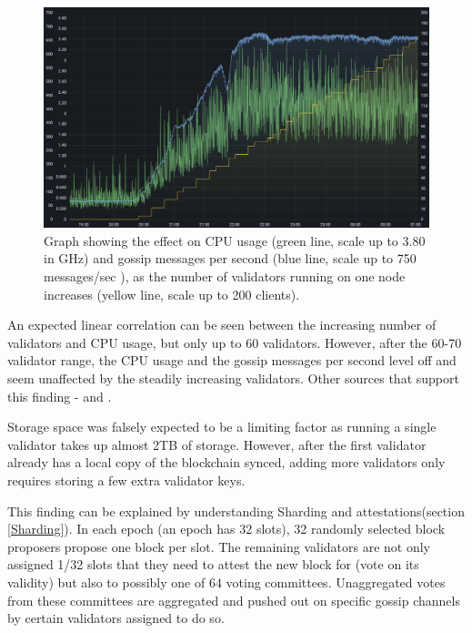 \begin{figure}[htb!]
    \centering
    \includegraphics[width=15cm,center]{Figures/cpuValidatorsGossip.png}
    \caption{Graph showing the effect on CPU usage (green line, scale up to 3.80 in GHz) and gossip messages per second (blue line, scale up to 750 messages/sec ), as the number of validators running on one node increases (yellow line, scale up to 200 clients). \cite{Sutton2022ExploringSymphonious}}
    \label{Figure:validatorIncrease}
\end{figure}

An expected linear correlation can be seen between the increasing number of validators and CPU usage, but only up to 60 validators. However, after the 60-70 validator range, the CPU usage and the gossip messages per second level off and seem unaffected by the steadily increasing validators. Other sources that support  this finding - \cite{Roy2022StakingExchange} and \cite{2021HardwareEthstaker}.

Storage space was falsely expected to be a limiting factor as running a single validator takes up almost 2TB of storage. However, after the first validator already has a local copy of the blockchain synced, adding more validators only requires storing a few extra validator keys.

This finding can be explained by understanding Sharding and attestations(section \ref{Sharding}). In each epoch (an epoch has 32 slots), 32 randomly selected block proposers propose one block per slot. The remaining validators are not only assigned 1/32 slots that they need to attest the new block for (vote on its validity) but also to possibly one of 64 voting committees. Unaggregated votes from these committees are aggregated and pushed out on specific gossip channels by certain validators assigned to do so. 

